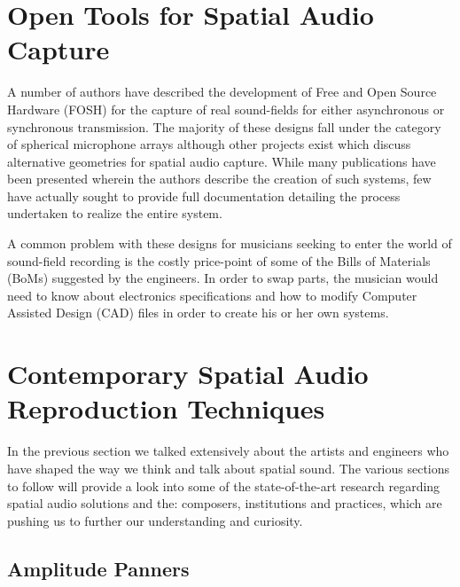 \section{Open Tools for Spatial Audio Capture}


A number of authors have described the development of Free and Open Source Hardware (FOSH) for the capture of real sound-fields for either asynchronous or synchronous transmission. The majority of these designs fall under the category of spherical microphone arrays although other projects exist which discuss alternative geometries for spatial audio capture. While many publications have been presented wherein the authors describe the creation of such systems, few have actually sought to provide full documentation detailing the process undertaken to realize the entire system. 

A common problem with these designs for musicians seeking to enter the world of sound-field recording is the costly price-point of some of the Bills of Materials (BoMs) suggested by the engineers. In order to swap parts, the musician would need to know about electronics specifications and how to modify Computer Assisted Design (CAD) files in order to create his or her own systems.

\section{Contemporary Spatial Audio Reproduction Techniques} \label{sec:contemp_audio_reproduction}

In the previous section we talked extensively about the artists and engineers who have shaped the way we think and talk about spatial sound. The various sections to follow will provide a look into some of the state-of-the-art research regarding spatial audio solutions and the: composers, institutions and practices, which are pushing us to further our understanding and curiosity. 

\subsection{Amplitude Panners}
\label{subsec:amplitude panner}



